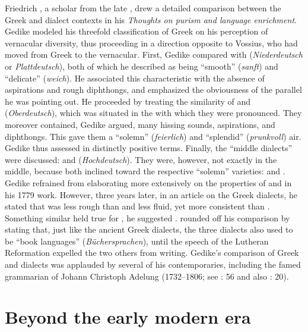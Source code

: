 Friedrich \citet[\textsc{xx}]{Gedike1779}, a  scholar from the late , drew a detailed comparison between the Greek and  dialect contexts in his \textit{Thoughts on purism and language enrichment}. Gedike modeled his threefold classification of Greek on his perception of vernacular  diversity, thus proceeding in a direction opposite to Vossius, who had moved from Greek to the vernacular. First, Gedike compared  with  (\textit{Niederdeutsch} or \textit{Plattdeutsch}), both of which he described as being “smooth” (\textit{sanft}) and “delicate” (\textit{weich}). He associated this characteristic with the absence of aspirations and rough diphthongs, and emphasized the obviousness of the parallel he was pointing out. He proceeded by treating the similarity of  and  (\textit{Oberdeutsch}), which was situated in the  with which they were pronounced. They moreover contained, Gedike argued, many hissing sounds, aspirations, and diphthongs. This gave them a “solemn” (\textit{feierlich}) and “splendid” (\textit{prunkvoll}) air. Gedike thus assessed  in distinctly positive terms. Finally, the “middle dialects” were discussed:  and  (\textit{Hochdeutsch}). They were, however, not exactly in the middle, because both inclined toward the respective “solemn” varieties:  and . Gedike refrained from elaborating more extensively on the properties of  and  in his 1779 work. However, three years later, in an article on the Greek dialects, he stated that  was less rough than  and less fluid, yet more consistent than . Something similar held true for , he suggested \citep[25]{Gedike1782}. \citet[\textsc{xx–xxi}]{Gedike1779} rounded off his comparison by stating that, just like the ancient Greek dialects, the three  dialects also used to be “book languages” (\textit{Büchersprachen}), until the  speech of the Lutheran Reformation expelled the two others from writing. Gedike’s comparison of Greek and  dialects was applauded by several of his contemporaries, including the famed grammarian of  Johann Christoph Adelung (1732–1806; see \citealt{Adelung1781}: 56 and also \citealt{Moritz1781}: 20).

\section{Beyond the early modern era}\label{sec:7.4}


